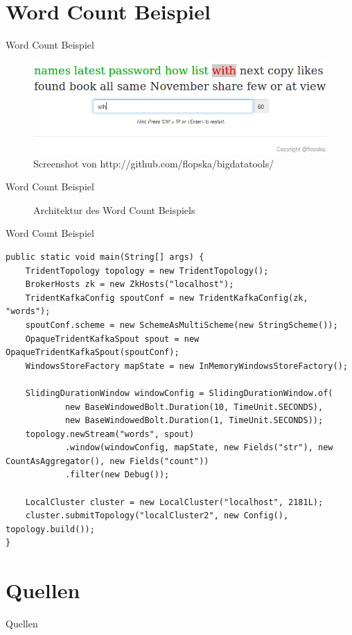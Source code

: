 \documentclass{beamer}
\begin{document}
\section{Word Count Beispiel}
\begin{frame}[t]{Word Count Beispiel}
  \begin{figure}
    \centering
    \includegraphics[scale=0.3,natwidth=750,natheight=234]{img/webapp.png}
    \caption{Screenshot von http://github.com/flopska/bigdatatools/}
  \end{figure}
\end{frame}

\begin{frame}[t]{Word Count Beispiel}
  \begin{figure}[h]
    \center
    \scalebox{.8}{}
    \caption{Architektur des Word Count Beispiels}
    \label{fig:wordcountsamplearchitecture}
  \end{figure}
\end{frame}

\begin{frame}[fragile]{Word Count Beispiel}
  \begin{lstlisting}
public static void main(String[] args) {
	TridentTopology topology = new TridentTopology();
	BrokerHosts zk = new ZkHosts("localhost");
	TridentKafkaConfig spoutConf = new TridentKafkaConfig(zk, "words");
	spoutConf.scheme = new SchemeAsMultiScheme(new StringScheme());
	OpaqueTridentKafkaSpout spout = new OpaqueTridentKafkaSpout(spoutConf);
	WindowsStoreFactory mapState = new InMemoryWindowsStoreFactory();

	SlidingDurationWindow windowConfig = SlidingDurationWindow.of(
			new BaseWindowedBolt.Duration(10, TimeUnit.SECONDS),
			new BaseWindowedBolt.Duration(1, TimeUnit.SECONDS));
	topology.newStream("words", spout)
			.window(windowConfig, mapState, new Fields("str"), new CountAsAggregator(), new Fields("count"))
			.filter(new Debug());

	LocalCluster cluster = new LocalCluster("localhost", 2181L);
	cluster.submitTopology("localCluster2", new Config(), topology.build());
}
  \end{lstlisting}
\end{frame}
\section{Quellen}
\begin{frame}[t]{Quellen}
\end{frame}
\end{document}
